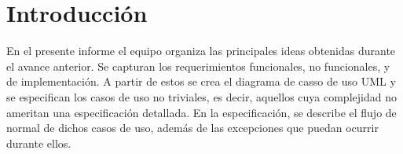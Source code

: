 \section{Introducción}

En el presente informe el equipo organiza las principales ideas obtenidas durante el avance anterior. Se capturan los requerimientos funcionales, no funcionales, y de implementación. A partir de estos se crea el diagrama de casso de uso UML y se especifican los casos de uso no triviales, es decir, aquellos cuya complejidad no ameritan una especificación detallada. En la especificación, se describe el flujo de normal de dichos casos de uso, además de las excepciones que puedan ocurrir durante ellos.
